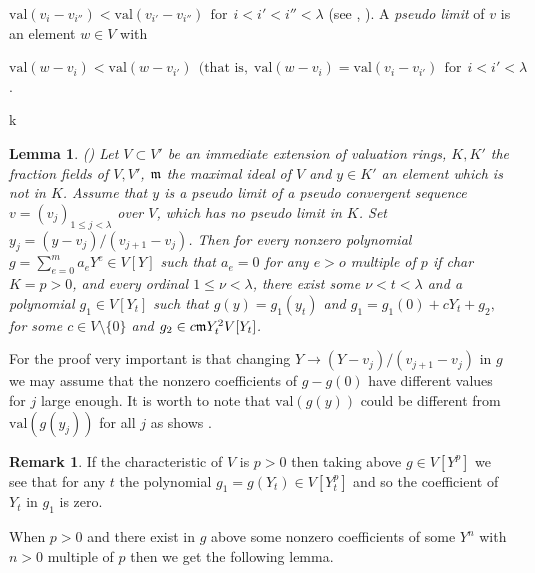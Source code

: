 \documentclass[12pt]{amsart}
\def\frk{\frak}               %
\def\mm{{\frk m}}
\let\to=\rightarrow
\newtheorem{Lemma}[Theorem]{Lemma}
\theoremstyle{definition}
\newtheorem{Remark}[Theorem]{Remark}
\theoremstyle{subsection-tweak}
\theoremstyle{theorem}
\theoremstyle{definition}
\newcommand{\val}{\mathrm{val}}		%
\begin{document}
$\val(v_{i} - v_{i''} ) < \val(v_{i'} - v_{i''} )     \ \ \mbox{for} \ \ i < i' < i'' < \lambda$
(see \cite{Kap}, \cite{Sch}).
A  \emph{pseudo limit} of $v$  is an element $w \in V$ with 

$ \val(w - v_{i}) < \val(w - v_{i'}) \ \ \mbox{(that is,} \ \ \val(w -  v_{i}) = \val(v_{i} - v_{i'}) \ \ \mbox{for} \ \ i < i' < \lambda$.

k
\begin{Lemma}(\cite[Proposition 16]{P3}) \label{l1}
Let $V \subset V'$ be an  immediate extension of valuation rings,  $K, K'$ the fraction fields of $V, V'$, $\mm$ the maximal ideal of $V$ and  $y\in K'$ an element  which is not in  $K$. Assume that  $y$ is  a pseudo limit of a pseudo convergent sequence $v=(v_j)_{1\leq j<\lambda}$ over $V$, which has no pseudo limit in $K$.
 Set $y_j=(y-v_j)/(v_{j+1}-v_j)$.
Then for every nonzero polynomial  $g =\sum_{e=0}^m a_e Y^e\in V[Y]$ such that  $a_e=0$ for any $e>o$ multiple of $p$ if char\ $K=p>0$,  and every ordinal $1\leq \nu<\lambda$,  there exist some  $\nu<t<\lambda$ and a polynomial $g_1\in V[Y_t]$ such that 
$g(y)=g_1(y_t)$
 and    $g_1=g_1(0)+c  Y_t+g_2,$
for some $c\in V\setminus \{0\}$ and  $g_2\in  c\mm Y_t^2 V[Y_t]$. 
\end{Lemma}

For the proof very important is that changing $Y\to (Y-v_j)/(v_{j+1}-v_j)$ in $g$  we may assume that the nonzero coefficients of $g-g(0)$ have different values for $j$ large enough. It is worth to note that $\val(g(y)) $ could be different from $\val(g(y_j))$ for all $j$ as shows \cite[Example 16]{P4}. 

\begin{Remark} \label{r}
If the characteristic of $V$ is $p>0$ then taking above $g\in V[Y^p]$ we see that for any $t$ the polynomial $g_1=g(Y_t)\in V[Y_t^p]$ and so the coefficient of $Y_t$ in $g_1$ is zero.
\end{Remark}

When $p>0$ and there exist  in $g$ above some nonzero coefficients of some $Y^n$ with $n>0$ multiple of $p$ then we get the following lemma.
\end{document}
